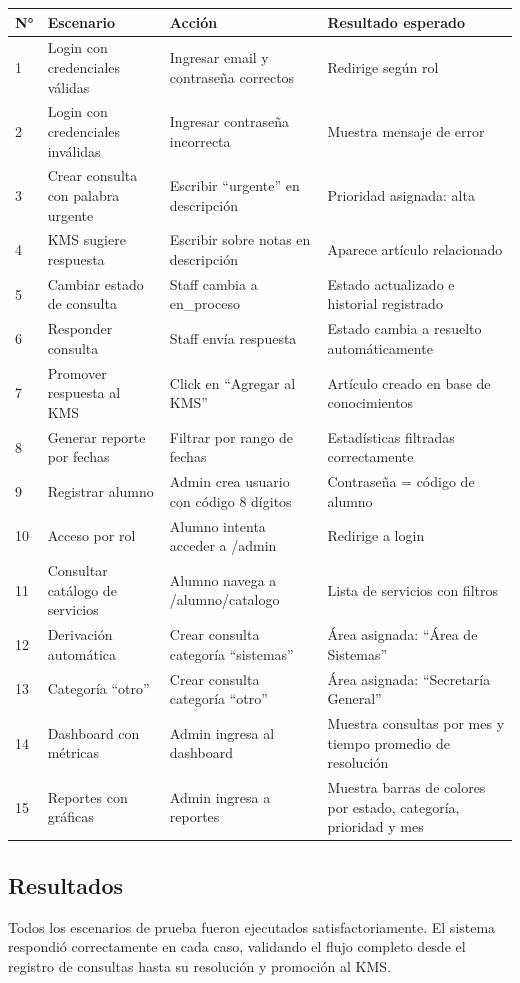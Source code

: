 \documentclass[12pt,a4paper]{article}
\begin{document}
	\begin{longtable}{p{1cm} p{4cm} p{4.5cm} p{4cm}}
	\toprule
	\textbf{N°} & \textbf{Escenario} & \textbf{Acción} & \textbf{Resultado esperado} \\
	\midrule
	1 & Login con credenciales válidas & Ingresar email y contraseña correctos & Redirige según rol \\
	2 & Login con credenciales inválidas & Ingresar contraseña incorrecta & Muestra mensaje de error \\
	3 & Crear consulta con palabra urgente & Escribir ``urgente'' en descripción & Prioridad asignada: alta \\
	4 & KMS sugiere respuesta & Escribir sobre notas en descripción & Aparece artículo relacionado \\
	5 & Cambiar estado de consulta & Staff cambia a en\_proceso & Estado actualizado e historial registrado \\
	6 & Responder consulta & Staff envía respuesta & Estado cambia a resuelto automáticamente \\
	7 & Promover respuesta al KMS & Click en ``Agregar al KMS'' & Artículo creado en base de conocimientos \\
	8 & Generar reporte por fechas & Filtrar por rango de fechas & Estadísticas filtradas correctamente \\
	9 & Registrar alumno & Admin crea usuario con código 8 dígitos & Contraseña = código de alumno \\
	10 & Acceso por rol & Alumno intenta acceder a /admin & Redirige a login \\
	11 & Consultar catálogo de servicios & Alumno navega a /alumno/catalogo & Lista de servicios con filtros \\
	12 & Derivación automática & Crear consulta categoría ``sistemas'' & Área asignada: ``Área de Sistemas'' \\
	13 & Categoría ``otro'' & Crear consulta categoría ``otro'' & Área asignada: ``Secretaría General'' \\
	14 & Dashboard con métricas & Admin ingresa al dashboard & Muestra consultas por mes y tiempo promedio de resolución \\
	15 & Reportes con gráficas & Admin ingresa a reportes & Muestra barras de colores por estado, categoría, prioridad y mes \\
	\bottomrule
	\end{longtable}

	\subsection{Resultados}
	Todos los escenarios de prueba fueron ejecutados satisfactoriamente. El sistema respondió correctamente en cada caso, validando el flujo completo desde el registro de consultas hasta su resolución y promoción al KMS.
\end{document}
